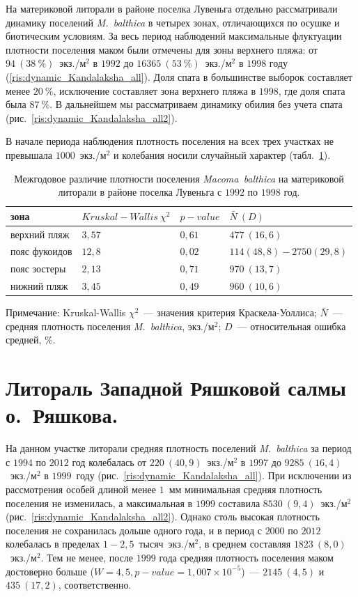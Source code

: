 На материковой литорали в районе поселка Лувеньга отдельно рассматривали динамику поселений {\it M.~balthica} в четырех зонах, отличающихся по осушке и биотическим условиям.
За весь период наблюдений максимальные флуктуации плотности поселения маком были отмечены для зоны верхнего пляжа: от $94~(38~\%)$~экз./м$^2$ в $1992$ до $16365~(53~\%)$~экз./м$^2$ в $1998$ году (\ref{ris:dynamic_Kandalaksha_all}). 
Доля спата в большинстве выборок составляет менее $20~\%$, исключение составляет зона верхнего пляжа в $1998$, где доля спата была $87~\%$.
В дальнейшем мы рассматриваем динамику обилия без учета спата (рис.~\ref{ris:dynamic_Kandalaksha_all2}).

В начале периода наблюдения плотность поселения на всех трех участках не превышала $1000$~экз./м$^2$ и колебания носили случайный характер (табл.~\ref{tab:2razrez_N2_Kruskal}).

	\begin{table}[p]
	\caption{Межгодовое различие плотности поселения {\it Macoma~balthica} на материковой литорали в районе поселка Лувеньга с $1992$ по $1998$ год.}
	\label{tab:2razrez_N2_Kruskal}
	\begin{tabularx}{\textwidth}{|*{4}{X|}} \hline
	зона & $Kruskal-Wallis\ \chi^2$ & $p-value$ & $\bar{N} ~ (D)$ \\ 
	\hline
	верхний пляж & $3,57$ & $0,61$ & $477~(16,6)$ \\
	\hline
	пояс фукоидов & $12,8$ & $0,02$ & $114 (48,8) - 2750 (29,8)$\\
	\hline
	пояс зостеры & $2,13$ & $0,71$ & $970~(13,7)$ \\
	\hline
	нижний пляж & $3,45$ & $0,49$ & $960~(10,6)$ \\
	\hline
	\end{tabularx}
	{\footnotesize Примечание: Kruskal-Wallis $\chi^2$~--- значения критерия Краскела-Уоллиса; $\bar{N}$~--- средняя плотность поселения {\it M.~balthica}, экз./м$^2$; $D$~--- относительная ошибка средней, \%.}
	\end{table}


		\section{Литораль Западной Ряшковой салмы о.~Ряшкова.}

На данном участке литорали средняя плотность поселений {\it M.~balthica} за период с $1994$ по $2012$ год колебалась от $220~(40,9)$~экз./м$^2$ в $1997$ до $9285~(16,4)$~экз./м$^2$ в $1999$~году (рис.~\ref{ris:dynamic_Kandalaksha_all}).
При исключении из рассмотрения особей длиной менее $1$~мм минимальная средняя плотность поселения не изменилась, а максимальная в $1999$ составила $8530~(9,4)$~экз./м$^2$ (рис.~\ref{ris:dynamic_Kandalaksha_all2}).
Однако столь высокая плотность поселения не сохранилась дольше одного года, и в период с $2000$ по $2012$ колебалась в пределах $1 - 2,5$~тысяч~экз./м$^2$, в среднем составляя $1823~(8,0)$~экз./м$^2$.
Тем не менее, после $1999$ года средняя плотность поселения маком достоверно больше ($W = 4,5, p-value = 1,007 \times 10^{-5}$)~--- $2145~(4,5)$ и $435~(17,2)$, соответственно.

